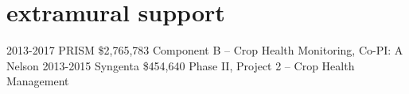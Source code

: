 \documentclass[]{friggeri-cv}
\begin{document}
\section{extramural support}
  \begin{entrylist}
  \entry
	{2013-2017}
	{PRISM }
	{\$2,765,783}
	{Component B -- Crop Health Monitoring, Co-PI: A Nelson}
  \entry
	{2013-2015}
	{Syngenta}
	{\$454,640}
	{Phase II, Project 2 -- Crop Health Management}
  \end{entrylist}


\end{document}
